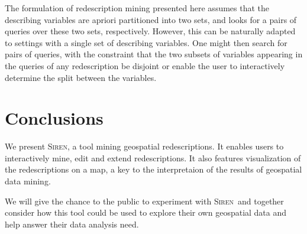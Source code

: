 \documentclass{sig-alternate}
\newcommand{\Siren}{\textsc{Siren}}
\begin{document}
The formulation of redescription mining presented here assumes that
the describing variables are apriori partitioned into two sets, and
looks for a pairs of queries over these two sets, respectively.
However, this can be naturally adapted to settings with a single set
of describing variables.  One might then search for pairs of queries,
with the constraint that the two subsets of variables appearing in the
queries of any redescription be disjoint or enable the user to
interactively determine the split between the variables.

\section{Conclusions}
We present \Siren, a tool mining geospatial
redescriptions. It enables users to interactively mine, edit and extend
redescriptions. It also features visualization of the redescriptions on a map, a key to the interpretaion of the results of geospatial data mining.

We will give the chance to the public to experiment with \Siren\ and
together consider how this tool could be used to explore their own geospatial
data and help answer their data analysis need.


  
\balancecolumns

\end{document}
